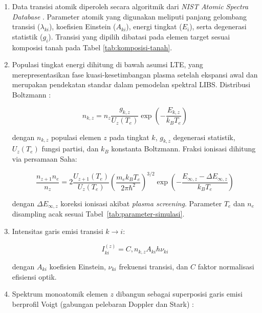 \documentclass[12pt, a4paper]{article}
\begin{document}
\begin{enumerate}[label=\arabic*., leftmargin=2cm]

\item Data transisi atomik diperoleh secara algoritmik dari \textit{NIST Atomic Spectra Database} \citep{kramida2024}. Parameter atomik yang digunakan meliputi panjang gelombang transisi ($\lambda_{ki}$), koefisien Einstein ($A_{ki}$), energi tingkat ($E_i$), serta degenerasi statistik ($g_i$). Transisi yang dipilih dibatasi pada elemen target sesuai komposisi tanah pada Tabel
\ref{tab:komposisi-tanah}.

\item Populasi tingkat energi dihitung di bawah asumsi LTE, yang merepresentasikan fase kuasi-kesetimbangan plasma setelah ekspansi awal dan merupakan pendekatan standar dalam pemodelan spektral LIBS. Distribusi Boltzmann \citep{fujimoto2004}:

\begin{equation}
n_{k,z} =
n_z
\frac{g_{k,z}}{U_z(T_e)}
\exp\left(-\frac{E_{k,z}}{k_B T_e}\right)
\label{eq:boltzmann}
\end{equation}

dengan $n_{k,z}$ populasi elemen $z$ pada tingkat $k$, $g_{k,z}$ degenerasi statistik, $U_z(T_e)$ fungsi partisi, dan $k_B$ konstanta Boltzmann. Fraksi ionisasi dihitung via persamaan Saha:

\begin{equation}
\frac{n_{z+1} n_e}{n_z}
=
2
\frac{U_{z+1}(T_e)}{U_z(T_e)}
\left(
\frac{m_e k_B T_e}{2\pi \hbar^2}
\right)^{3/2}
\exp
\left(
-\frac{E_{\infty,z}-\Delta E_{\infty,z}}{k_B T_e}
\right)
\label{eq:saha}
\end{equation}

dengan $\Delta E_{\infty,z}$ koreksi ionisasi akibat \textit{plasma screening}. Parameter $T_e$ dan $n_e$ disampling acak sesuai Tabel~\ref{tab:parameter-simulasi}.

\item Intensitas garis emisi transisi $k \rightarrow i$:

\begin{equation}
I_{ki}^{(z)}
=
C , n_{k,z} A_{ki} h \nu_{ki}
\end{equation}

dengan $A_{ki}$ koefisien Einstein, $\nu_{ki}$ frekuensi transisi, dan $C$ faktor normalisasi efisiensi optik.

\item Spektrum monoatomik elemen $z$ dibangun sebagai superposisi garis emisi berprofil Voigt (gabungan pelebaran Doppler dan Stark) \citep{griem1974}:


\end{enumerate}
\end{document}
